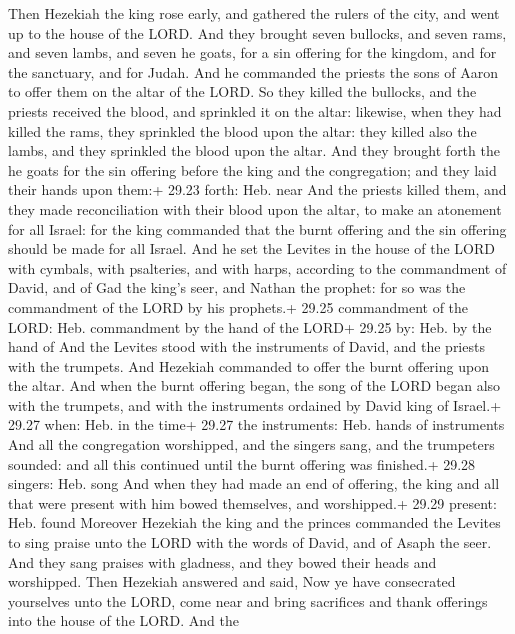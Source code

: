  Then Hezekiah the king rose early, and gathered the
rulers of the city, and went up to the house of the LORD. 
And they brought seven bullocks, and seven rams, and seven lambs, and
seven he goats, for a sin offering for the kingdom, and for the
sanctuary, and for Judah. And he commanded the priests the sons of Aaron
to offer them on the altar of the LORD.  So they killed the
bullocks, and the priests received the blood, and sprinkled it on the
altar: likewise, when they had killed the rams, they sprinkled the blood
upon the altar: they killed also the lambs, and they sprinkled the blood
upon the altar.  And they brought forth the he goats for
the sin offering before the king and the congregation; and they laid
their hands upon them:+ 29.23 forth: Heb. near  And the
priests killed them, and they made reconciliation with their blood upon
the altar, to make an atonement for all Israel: for the king commanded
that the burnt offering and the sin offering should be made for all
Israel.  And he set the Levites in the house of the LORD
with cymbals, with psalteries, and with harps, according to the
commandment of David, and of Gad the king's seer, and Nathan the
prophet: for so was the commandment of the LORD by his prophets.+ 29.25
commandment of the LORD: Heb. commandment by the hand of the LORD+ 29.25
by: Heb. by the hand of  And the Levites stood with the
instruments of David, and the priests with the trumpets. 
And Hezekiah commanded to offer the burnt offering upon the altar. And
when the burnt offering began, the song of the LORD began also with the
trumpets, and with the instruments ordained by David king of Israel.+
29.27 when: Heb. in the time+ 29.27 the instruments: Heb. hands of
instruments  And all the congregation worshipped, and the
singers sang, and the trumpeters sounded: and all this continued until
the burnt offering was finished.+ 29.28 singers: Heb. song 
And when they had made an end of offering, the king and all that were
present with him bowed themselves, and worshipped.+ 29.29 present: Heb.
found  Moreover Hezekiah the king and the princes commanded
the Levites to sing praise unto the LORD with the words of David, and of
Asaph the seer. And they sang praises with gladness, and they bowed
their heads and worshipped.  Then Hezekiah answered and
said, Now ye have consecrated yourselves unto the LORD, come near and
bring sacrifices and thank offerings into the house of the LORD. And the
